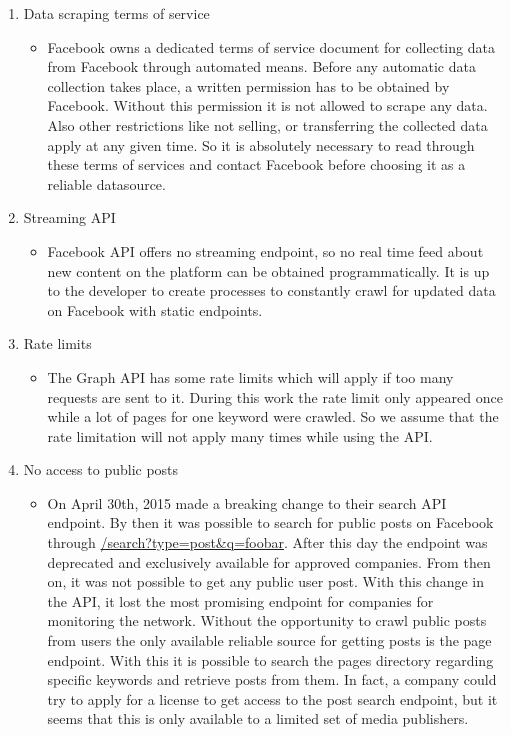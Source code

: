 \documentclass[11pt,titlepage,oneside,openany]{book}
\begin{document}
\begin{enumerate}
   \item Data scraping terms of service
   \begin{itemize}
     \item Facebook owns a dedicated terms of service document for collecting data from Facebook 		       through automated means. Before any automatic data collection takes place, a written permission has to be obtained by Facebook. Without this permission it is not allowed to scrape any data. Also other restrictions like not selling, or transferring the collected data apply at any given time. So it is absolutely necessary to read through these terms of services and contact Facebook before choosing it as a reliable datasource.~\cite{Facebook2010-04-10}
   \end{itemize}
   \item Streaming API
   \begin{itemize}
     \item Facebook API offers no streaming endpoint, so no real time feed about new content on the platform can be obtained programmatically. It is up to the developer to create processes to constantly crawl for updated data on Facebook with static endpoints.
   \end{itemize}
   \item Rate limits
   \begin{itemize}
     \item The Graph API has some rate limits which will apply if too many requests are sent to it. During this work the rate limit only appeared once while a lot of pages for one keyword were crawled. So we assume that the rate limitation will not apply many times while using the API.~\cite{Facebook2016-06-09} 
   \end{itemize}
   \item No access to public posts
   \begin{itemize}
     \item On April 30th, 2015 made a breaking change to their search API endpoint. By then it was possible to search for public posts on Facebook through \url{/search?type=post&q=foobar}. After this day the endpoint was deprecated and exclusively available for approved companies. From then on, it was not possible to get any public user post. With this change in the API, it lost the most promising endpoint for companies for monitoring the network. Without the opportunity to crawl public posts from users the only available reliable source for getting posts is the page endpoint. With this it is possible to search the pages directory regarding specific keywords and retrieve posts from them. 
In fact, a company could try to apply for a license to get access to the post search endpoint, but it seems that this is only available to a limited set of media publishers.~\cite{Facebook2013-09-06} 
   \end{itemize}
\end{enumerate}
\end{document}
